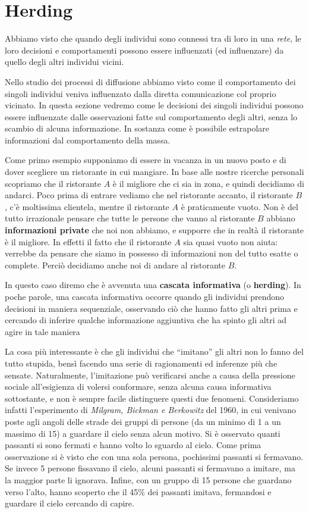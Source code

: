 \chapter{Herding}

Abbiamo visto che quando degli individui sono connessi tra di loro in una \textit{rete}, le loro decisioni e comportamenti possono essere influenzati (ed influenzare) da quello degli altri individui vicini.

Nello studio dei processi di diffusione abbiamo visto come il comportamento dei singoli individui veniva influenzato dalla diretta comunicazione col proprio vicinato. In questa sezione vedremo come le decisioni dei singoli individui possono essere influenzate dalle osservazioni fatte sul comportamento degli altri, senza lo scambio di alcuna informazione. In sostanza come è possibile estrapolare informazioni dal comportamento della massa.

Come primo esempio supponiamo di essere in vacanza in un nuovo posto e di dover scegliere un ristorante in cui mangiare. In base alle nostre ricerche personali scopriamo che il ristorante $A$ è il migliore che ci sia in zona, e quindi decidiamo di andarci. Poco prima di entrare vediamo che nel ristorante accanto, il ristorante $B$, c'è moltissima clientela, mentre il ristorante $A$ è praticamente vuoto. Non è del tutto irrazionale pensare che tutte le persone che vanno al ristorante $B$ abbiano \textbf{informazioni private} che noi non abbiamo, e supporre che in realtà il ristorante è il migliore. In effetti il fatto che il ristorante $A$ sia quasi vuoto non aiuta: verrebbe da pensare che siamo in possesso di informazioni non del tutto esatte o complete. Perciò decidiamo anche noi di andare al ristorante $B$.

In questo caso diremo che è avvenuta una \textbf{cascata informativa} (o \textbf{herding}). In poche parole, una cascata informativa occorre quando gli individui prendono decisioni in maniera sequenziale, osservando ciò che hanno fatto gli altri prima e cercando di inferire qualche informazione aggiuntiva che ha spinto gli altri ad agire in tale maniera

La cosa più interessante è che gli individui che “imitano” gli altri non lo fanno del tutto stupida, bensì facendo una serie di ragionamenti ed inferenze più che sensate. Naturalmente, l'imitazione può verificarsi anche a causa della pressione sociale all'esigienza di volersi conformare, senza alcuna causa informativa sottostante, e non è sempre facile distinguere questi due fenomeni. Consideriamo infatti l'esperimento di \textit{Milgram, Bickman e Berkowitz} del 1960, in cui venivano poste agli angoli delle strade dei gruppi di persone (da un minimo di 1 a un massimo di 15) a guardare il cielo senza alcun motivo. Si è osservato quanti passanti si sono fermati e hanno volto lo sguardo al cielo. Come prima osservazione si è visto che con una sola persona, pochissimi passanti si fermavano. Se invece 5 persone fissavano il cielo, alcuni passanti si fermavano a imitare, ma la maggior parte li ignorava. Infine, con un gruppo di 15 persone che guardano verso l'alto, hanno scoperto che il 45\% dei passanti imitava, fermandosi e guardare il cielo cercando di capire.

